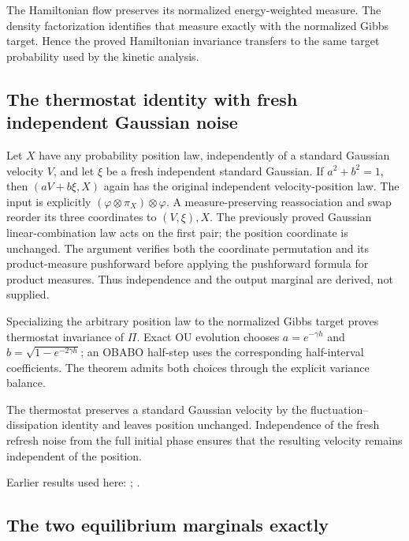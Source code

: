 \documentclass[11pt,a4paper]{report}
\begin{document}
The Hamiltonian flow preserves its normalized energy-weighted measure. The density factorization identifies that measure exactly with the normalized Gibbs target. Hence the proved Hamiltonian invariance transfers to the same target probability used by the kinetic analysis.

\subsection{\texorpdfstring{The thermostat identity with fresh independent Gaussian noise}{The thermostat identity with fresh independent Gaussian noise}}
\label{report-step-KineticLangevin-GibbsTarget-lean-4}


Let \(X\) have any probability position law, independently of a standard Gaussian velocity \(V\), and let \(\xi\) be a fresh independent standard Gaussian. If \(a^2+b^2=1\), then \((aV+b\xi,X)\) again has the original independent velocity-position law. The input is explicitly \((\varphi\otimes\pi_X)\otimes\varphi\). A measure-preserving reassociation and swap reorder its three coordinates to \((V,\xi),X\). The previously proved Gaussian linear-combination law acts on the first pair; the position coordinate is unchanged. The argument verifies both the coordinate permutation and its product-measure pushforward before applying the pushforward formula for product measures. Thus independence and the output marginal are derived, not supplied.



Specializing the arbitrary position law to the normalized Gibbs target proves thermostat invariance of \(\Pi\). Exact OU evolution chooses \(a=e^{-\gamma h}\) and \(b=\sqrt{1-e^{-2\gamma h}}\); an OBABO half-step uses the corresponding half-interval coefficients. The theorem admits both choices through the explicit variance balance.



The thermostat preserves a standard Gaussian velocity by the fluctuation–dissipation identity and leaves position unchanged. Independence of the fresh refresh noise from the full initial phase ensures that the resulting velocity remains independent of the position.



Earlier results used here: \cite[Section~3.26.13]{LangevinLean2026ULASC}; \cite[Section~3.26.3]{LangevinLean2026ULASC}.
\subsection{\texorpdfstring{The two equilibrium marginals exactly}{The two equilibrium marginals exactly}}
\label{report-step-KineticLangevin-GibbsTarget-lean-5}
\end{document}

